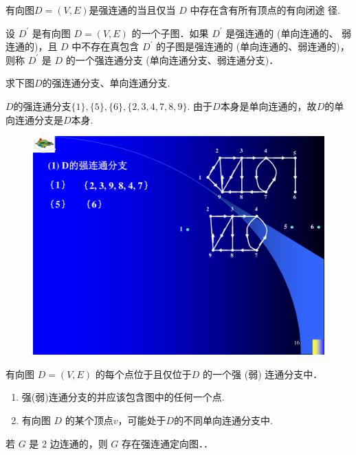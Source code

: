 \begin{theorem}
有向图$D=(V,E)$是强连通的当且仅当 $D$ 中存在含有所有顶点的有向闭途
径.
\end{theorem}


\begin{definition}
	设 $D^{'}$ 是有向图 $D = (V, E)$ 的一个子图．如果 $D^{'}$ 是强连通的 (单向连通的、
	弱连通的)，且 $D$ 中不存在真包含 $D^{'}$ 的子图是强连通的 (单向连通的、弱连通的)，则称 $D^{'}$
	是 $D$ 的一个强连通分支 (单向连通分支、弱连通分支)．
\end{definition}
\begin{example}
求下图$D$的强连通分支、单向连通分支.
	
\noindent {\bfseries\songti \textcolor{ecolor}{解：}} $D$的强连通分支$\{1\},\{5\},\{6\},\{2,3,4,7,8,9\}$. 由于$D$本身是单向连通的，故$D$的单向连通分支是$D$本身.	
		\begin{figure}[H]
		\small
		\centering 
		\includegraphics[scale=0.6]{image/CH9_qiangliantong.pdf}  
		\label{figkkk1ijjj}  
	\end{figure}
\end{example}


\begin{theorem}
有向图 $D = (V, E)$ 的每个点位于且仅位于$D$ 的一个强 (弱) 连通分支中．
\end{theorem}
\begin{note}
	\begin{enumerate}
		\item 强(弱)连通分支的并应该包含图中的任何一个点.
		\item 有向图 $D$ 的某个顶点$v$，可能处于$D$的不同单向连通分支中.
	\end{enumerate}
\end{note}


\begin{theorem}
	若 $G$ 是 2 边连通的，则 $G$ 存在强连通定向图．．
\end{theorem}
